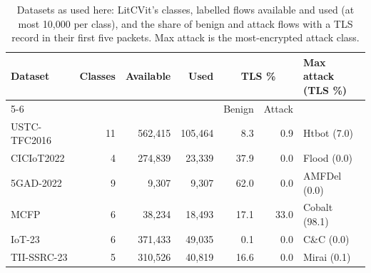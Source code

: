 \begin{table}[t]
\centering
\caption{Datasets as used here: LitCVit's classes, labelled flows available and used (at most 10{,}000 per class), and the share of benign and attack flows with a TLS record in their first five packets. Max attack is the most-encrypted attack class.}
\label{tab:datasets}
\setlength{\tabcolsep}{2pt}
\scriptsize
\begin{tabular}{lrrrrrl}
\toprule
Dataset & Classes & Available & Used & \multicolumn{2}{c}{TLS \%} & Max attack (TLS \%) \\
\cmidrule(lr){5-6}
 & & & & Benign & Attack & \\
\midrule
USTC-TFC2016 & 11 & 562{,}415 & 105{,}464 & 8.3 & 0.9 & Htbot (7.0) \\
CICIoT2022 & 4 & 274{,}839 & 23{,}339 & 37.9 & 0.0 & Flood (0.0) \\
5GAD-2022 & 9 & 9{,}307 & 9{,}307 & 62.0 & 0.0 & AMFDel (0.0) \\
MCFP & 6 & 38{,}234 & 18{,}493 & 17.1 & 33.0 & Cobalt (98.1) \\
IoT-23 & 6 & 371{,}433 & 49{,}035 & 0.1 & 0.0 & C\&C (0.0) \\
TII-SSRC-23 & 5 & 310{,}526 & 40{,}819 & 16.6 & 0.0 & Mirai (0.1) \\
\bottomrule
\end{tabular}
\end{table}

